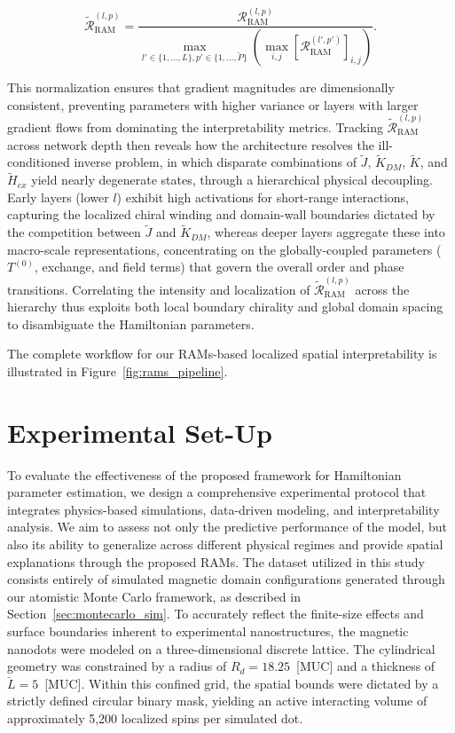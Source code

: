 \documentclass[final,5p,times,twocolumn]{elsarticle}
\begin{document}
\begin{equation}\label{eq:RAM_Global_Norm}
\tilde{\mathcal{R}}_{\text{RAM}}^{(l,p)} = \frac{\mathcal{R}_{\text{RAM}}^{(l,p)}}{\max\limits_{l' \in \{1,\dots,L\}, p' \in \{1,\dots,\breve{P}\}} \left( \max\limits_{i,j} \left[ \mathcal{R}_{\text{RAM}}^{(l',p')}\right]_{i,j} \right)}.
\end{equation}

This normalization ensures that gradient magnitudes are dimensionally consistent, preventing parameters with higher variance or layers with larger gradient flows from dominating the interpretability metrics. Tracking $\tilde{\mathcal{R}}_{\text{RAM}}^{(l,p)}$ across network depth then reveals how the architecture resolves the ill-conditioned inverse problem, in which disparate combinations of $\tilde{J}$, $\tilde{K}_{DM}$, $\tilde{K}$, and $\tilde{H}_{ex}$ yield nearly degenerate states, through a hierarchical physical decoupling. Early layers (lower $l$) exhibit high activations for short-range interactions, capturing the localized chiral winding and domain-wall boundaries dictated by the competition between $\tilde{J}$ and $\tilde{K}_{DM}$, whereas deeper layers aggregate these into macro-scale representations, concentrating on the globally-coupled parameters ($T^{(0)}$, exchange, and field terms) that govern the overall order and phase transitions. Correlating the intensity and localization of $\tilde{\mathcal{R}}_{\text{RAM}}^{(l,p)}$ across the hierarchy thus exploits both local boundary chirality and global domain spacing to disambiguate the Hamiltonian parameters.


The complete workflow for our RAMs-based localized spatial interpretability is illustrated in Figure~\ref{fig:rams_pipeline}.



\section{Experimental Set-Up}\label{sec:experiments}

To evaluate the effectiveness of the proposed framework 
for Hamiltonian parameter estimation, we design a 
comprehensive experimental protocol that integrates 
physics-based simulations, data-driven modeling, and 
interpretability analysis. We aim to assess not only the predictive 
performance of the model, but also its ability to 
generalize across different physical regimes and provide spatial explanations through the proposed RAMs. 
The dataset utilized in this study consists entirely of 
simulated magnetic domain configurations generated through 
our atomistic Monte Carlo framework, as described in 
Section~\ref{sec:montecarlo_sim}. To accurately reflect 
the finite-size effects and surface boundaries inherent 
to experimental nanostructures, the magnetic nanodots 
were modeled on a three-dimensional discrete lattice. 
The cylindrical geometry was constrained by a radius of 
$R_d = 18.25$~[MUC] and a thickness of $\breve{L} = 5$~[MUC]. 
Within this confined grid, the spatial bounds were 
dictated by a strictly defined circular binary mask, 
yielding an active interacting volume of approximately 
5,200 localized spins per simulated dot.
\end{document}
